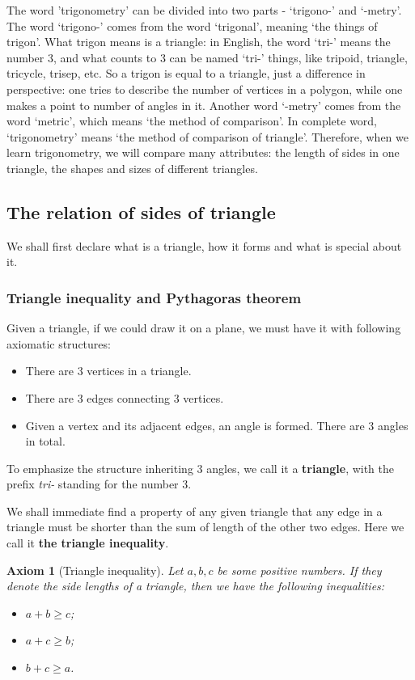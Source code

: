 \documentclass[12pt]{article}
\newtheorem*{axiom}{Axiom}
\begin{document}
    The word 'trigonometry' can be divided into two parts - `trigono-' and `-metry'. The word `trigono-' comes from the word `trigonal', meaning `the things of trigon'. What trigon means is a triangle: in English, the word `tri-' means the number 3, and what counts to 3 can be named `tri-' things, like tripoid, triangle, tricycle, trisep, etc. So a trigon is equal to a triangle, just a difference in perspective: one tries to describe the number of vertices in a polygon, while one makes a point to number of angles in it. Another word `-metry' comes from the word `metric', which means `the method of comparison'. In complete word, `trigonometry' means `the method of comparison of triangle'. Therefore, when we learn trigonometry, we will compare many attributes: the length of sides in one triangle, the shapes and sizes of different triangles.

    \subsection{The relation of sides of triangle}

    We shall first declare what is a triangle, how it forms and what is special about it.

    \subsubsection*{Triangle inequality and Pythagoras theorem}

    Given a triangle, if we could draw it on a plane, we must have it with following axiomatic structures:\begin{itemize}
        \item There are 3 vertices in a triangle.
        \item There are 3 edges connecting 3 vertices.
        \item Given a vertex and its adjacent edges, an angle is formed. There are 3 angles in total.
    \end{itemize}

    To emphasize the structure inheriting 3 angles, we call it a \textbf{triangle}, with the prefix \textit{tri-} standing for the number 3.

    We shall immediate find a property of any given triangle that any edge in a triangle must be shorter than the sum of length of the other two edges. Here we call it \textbf{the triangle inequality}.

    \begin{axiom}[Triangle inequality]
        Let $a,b,c$ be some positive numbers. If they denote the side lengths of a triangle, then we have the following inequalities:\begin{itemize}
            \item $a+b\geq c$;
            \item $a+c\geq b$;
            \item $b+c\geq a$.
        \end{itemize}
    \end{axiom}
\end{document}
